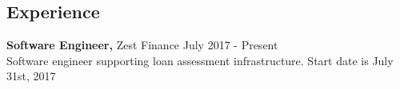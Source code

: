 \documentclass[margin]{res}
\begin{document}
 
 
\address{{\bf Current Location} \\ Encinitas, CA 92024}
\address{{\bf Contact Information} \\ Mobile: \space \space (724) VAN-VEEN \\Email: \space \space \space michael@mvanveen.net\\Website: \space mvv.io\\
Github: \space \space github.com/mvanveen} 
\begin{resume} 
 
\section{Experience}

  {\bf Software Engineer,} Zest Finance \hfill July 2017 - Present\\
  Software engineer supporting loan assessment infrastructure.  Start date is July 31st, 2017 \\


\end{resume}
\end{document}
